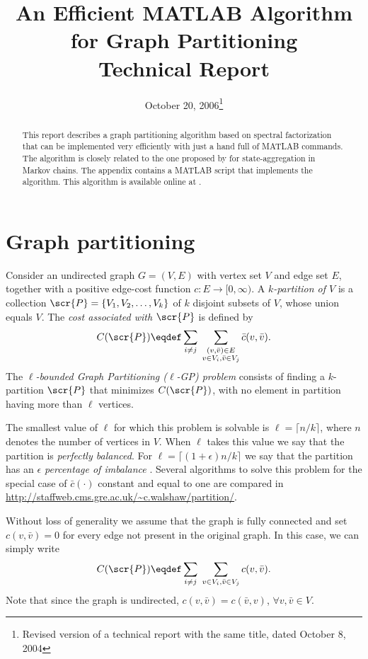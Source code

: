 \documentclass[10pt]{article}
\title{\Large\sc An Efficient MATLAB Algorithm for Graph Partitioning\\[1em]
  \large Technical Report}
\author{\jph}
\date{October 20, 2006\thanks{Revised version of a technical report
    with the same title, dated October 8, 2004}}
\begin{document}
                        \maketitle

\begin{abstract}
  This report describes a graph partitioning algorithm based on
  spectral factorization that can be implemented very efficiently with
  just a hand full of MATLAB commands. The algorithm is closely
  related to the one proposed by \citet{PhillipsKokotovicOct81} for
  state-aggregation in Markov chains. The appendix contains a MATLAB
  script that implements the algorithm. This algorithm is available
  online at \cite{HespanhaOct04}.
\end{abstract}

\section{Graph partitioning}

Consider an undirected graph $G=(V,E)$ with vertex set $V$ and edge
set $E$, together with a positive edge-cost function $c:E\to[0,\infty)$. A
\emph{$k$-partition of $V$} is a collection
$\scr{P}=\{V_1,V_2,\dots,V_k\}$ of $k$ disjoint subsets of $V$, whose
union equals $V$. The \emph{cost associated with $\scr{P}$} is defined
by
\begin{align*}
  C(\scr{P})\eqdef \sum_{i\neq j}\; \sum_{\substack{(v,\bar v)\in E\\v\in V_i,\bar v\in V_j}}
  \bar c(v,\bar v).
\end{align*}
The \emph{$\ell$-bounded Graph Partitioning ($\ell$-GP) problem} consists of
finding a $k$-partition $\scr{P}$ that minimizes $C(\scr{P})$, with no
element in partition having more than $\ell$ vertices.

\medskip

The smallest value of $\ell$ for which this problem is solvable is $\ell=\lceil
n/k\rceil$, where $n$ denotes the number of vertices in $V$.  When $\ell$
takes this value we say that the partition is \emph{perfectly
  balanced}. For $\ell=\lceil (1+\epsilon)n/k\rceil$ we say that the partition has an
\emph{$\epsilon$ percentage of imbalance} . Several algorithms to solve this
problem for the special case of $\bar c(\cdot)$ constant and equal to one
are compared in
\url{http://staffweb.cms.gre.ac.uk/~c.walshaw/partition/}.

\medskip

Without loss of generality we assume that the graph is fully connected
and set $c(v,\bar v)=0$ for every edge not present in the original
graph. In this case, we can simply write
\begin{align*}
  C(\scr{P})\eqdef \sum_{i\neq j}\; \sum_{v\in V_i,\bar v\in V_j} c(v,\bar v).
\end{align*}
Note that since the graph is undirected, $c(v,\bar v)=c(\bar v,v)$, $\forall
v,\bar v\in V$.
\end{document}
